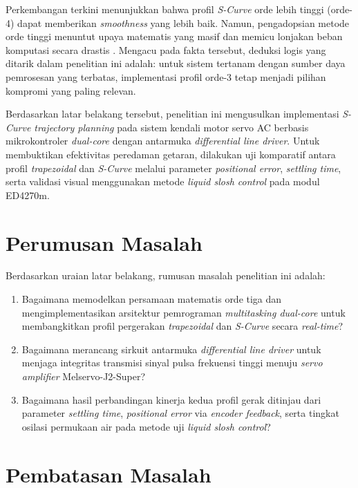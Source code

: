Perkembangan terkini menunjukkan bahwa profil \textit{S-Curve} orde lebih tinggi
(orde-4) dapat memberikan \textit{smoothness} yang lebih baik. Namun,
pengadopsian metode orde tinggi menuntut upaya matematis yang masif dan memicu
lonjakan beban komputasi secara drastis \parencite{tatte2026optimized}. Mengacu
pada fakta tersebut, deduksi logis yang ditarik dalam penelitian ini adalah:
untuk sistem tertanam dengan sumber daya pemrosesan yang terbatas, implementasi
profil orde-3 tetap menjadi pilihan kompromi yang paling relevan.

Berdasarkan latar belakang tersebut, penelitian ini mengusulkan implementasi
\textit{S-Curve trajectory planning} pada sistem kendali motor servo AC berbasis
mikrokontroler \textit{dual-core} dengan antarmuka \textit{differential line
driver}. Untuk membuktikan efektivitas peredaman getaran, dilakukan uji
komparatif antara profil \textit{trapezoidal} dan \textit{S-Curve} melalui
parameter \textit{positional error}, \textit{settling time}, serta validasi
visual menggunakan metode \textit{liquid slosh control} pada modul ED4270m.

\section{Perumusan Masalah}

Berdasarkan uraian latar belakang, rumusan masalah penelitian ini adalah:
\begin{enumerate}
    \item Bagaimana memodelkan persamaan matematis orde tiga dan mengimplementasikan arsitektur pemrograman \textit{multitasking dual-core} untuk membangkitkan profil pergerakan \textit{trapezoidal} dan \textit{S-Curve} secara \textit{real-time}?
    \item Bagaimana merancang sirkuit antarmuka \textit{differential line driver} untuk menjaga integritas transmisi sinyal pulsa frekuensi tinggi menuju \textit{servo amplifier} Melservo-J2-Super?
    \item Bagaimana hasil perbandingan kinerja kedua profil gerak ditinjau dari parameter \textit{settling time}, \textit{positional error} via \textit{encoder feedback}, serta tingkat osilasi permukaan air pada metode uji \textit{liquid slosh control}?
\end{enumerate}

\section{Pembatasan Masalah}

